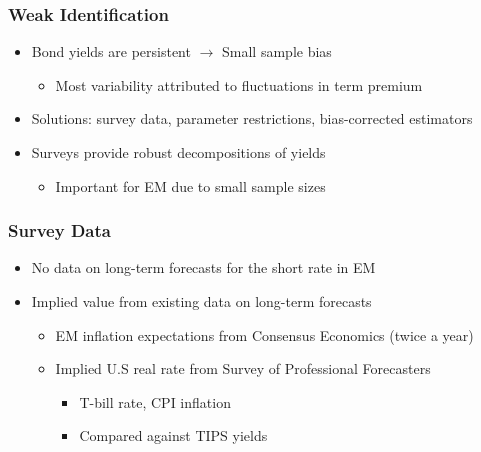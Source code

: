 \documentclass[12pt, aspectratio=169, xcolor=dvipsnames]{beamer}  %
\begin{document}
\begin{frame}
	\frametitle{Weak Identification}
	\begin{itemize}
		\item Bond yields are persistent $\rightarrow$ Small sample bias \citep{KimOrphanides:2012}
		\begin{itemize}
			\item Most variability attributed to fluctuations in term premium
		\end{itemize}
	\item Solutions: survey data, parameter restrictions, bias-corrected estimators
	\item \alert{Surveys} provide robust decompositions of yields \citep{Guimaraes:2014}
	\begin{itemize}
		\item Important for EM due to small sample sizes
	\end{itemize}
	\end{itemize}
\end{frame}

\begin{frame}[label=SCBP]
\frametitle{Survey Data}
\begin{itemize}
	\item No data on long-term forecasts for the short rate in EM
	\item Implied value from existing data on long-term forecasts
	\begin{itemize}
		\item EM inflation expectations from Consensus Economics (twice a year)
		\item Implied U.S real rate from Survey of Professional Forecasters
		\begin{itemize}
			\item T-bill rate, CPI inflation
			\item Compared against TIPS yields
		\end{itemize}
	\end{itemize}
\end{itemize}
\end{frame}
\end{document}
